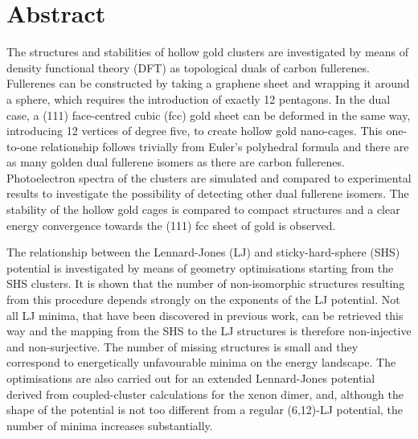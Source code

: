 
\chapter*{Abstract}


The structures and stabilities of hollow gold clusters are investigated by means
of density functional theory (DFT) as topological duals of carbon fullerenes.
Fullerenes can be constructed by taking a graphene sheet and wrapping it around
a sphere, which requires the introduction of exactly 12 pentagons. In the dual
case, a (111) face-centred cubic (fcc) gold sheet can be deformed in the same
way, introducing 12 vertices of degree five, to create hollow gold nano-cages.
This one-to-one relationship follows trivially from Euler's polyhedral formula
and there are as many golden dual fullerene isomers as there are carbon
fullerenes. Photoelectron spectra of the clusters are simulated and
compared to experimental results to investigate the possibility of detecting
other dual fullerene isomers. The stability of the hollow gold cages is compared
to compact structures and a clear energy convergence towards the (111) fcc sheet
of gold is observed. 

The relationship between the Lennard-Jones (LJ) and sticky-hard-sphere (SHS)
potential is investigated by means of geometry optimisations starting from the
SHS clusters. It is shown that the number of non-isomorphic structures
resulting from this procedure depends strongly on the exponents of the LJ
potential. Not all LJ minima, that have been discovered in previous work, can
be retrieved this way and the mapping from the SHS to the LJ structures is
therefore non-injective and non-surjective. The number of missing structures is
small and they correspond to energetically unfavourable minima on the energy
landscape. The optimisations are also carried out for an extended Lennard-Jones
potential derived from coupled-cluster calculations for the xenon dimer, and,
although the shape of the potential is not too different from a regular (6,12)-LJ
potential, the number of minima increases substantially.


